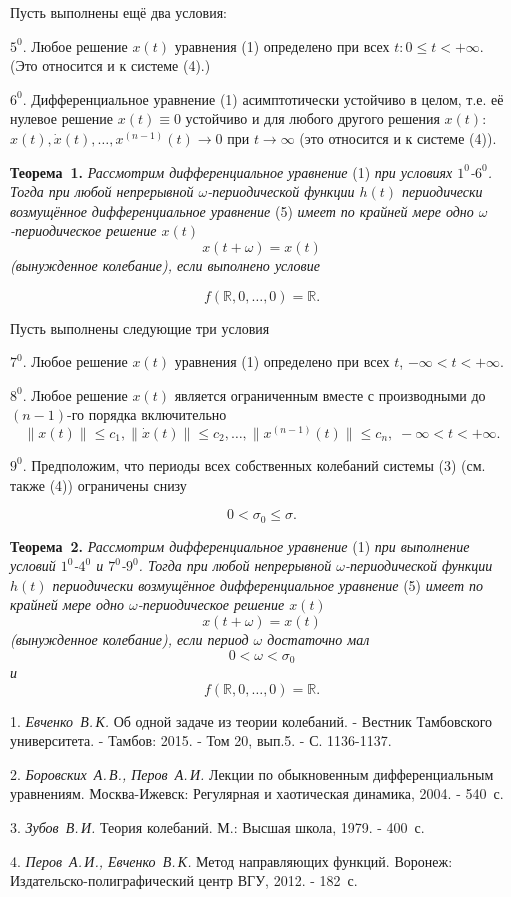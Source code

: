 Пусть выполнены ещё  два условия:

$5^0$. Любое решение $x(t)$ уравнения (1)  определено при всех $t:0\leqslant t< +\infty$.
(Это относится и к системе (4).)

$6^0$. Дифференциальное уравнение (1) асимптотически устойчиво в целом, т.е. её нулевое решение
$x(t)\equiv 0$ устойчиво и для любого другого решения $x(t)$:
$x(t), \dot x(t),\ldots , x^{(n-1)}(t)\rightarrow 0$ при  $t\rightarrow\infty$ (это относится и к системе (4)).

\textbf{Теорема~1.} {\it Рассмотрим дифференциальное уравнение} (1) {\it при условиях $1^0$-$6^0$. Тогда
	при любой непрерывной $\omega$-пе\-ри\-о\-ди\-чес\-кой функции  $h(t)$ периодически возмущённое дифференциальное
	уравнение} (5) {\it имеет по крайней мере одно $\omega$-периодическое решение  $x(t)$
		$$x(t+\omega)=x(t)$$
	(вынужденное колебание), если выполнено условие}

$$f(\mathbb{ R},0,\ldots,0)=\mathbb{ R}.$$



Пусть выполнены следующие три условия

$7^0$. Любое решение $x(t)$ уравнения (1) определено при всех $t$, $-\infty<t<+\infty$.

$8^0$. Любое решение $x(t)$ является ограниченным вместе с производными до $(n-1)$-го порядка включительно
$$\|x(t)\|\leqslant c_1, \|\dot{x}(t)\|\leqslant c_2, \ldots, \|x^{(n-1)}(t)\|\leqslant c_n,\;  -\infty<t<+\infty.$$

$9^0$. Предположим, что периоды всех собственных колебаний системы (3) (см. также (4)) ограничены снизу

$$ 0<\sigma_0 \leqslant \sigma. $$

\textbf{Теорема~2.} {\it Рассмотрим дифференциальное уравнение} (1) {\it при выполнение условий $1^0$-$4^0$ и $7^0$-$9^0$. Тогда
	при любой непрерывной  $\omega$-периодической функции  $h(t)$  периодически возмущённое дифференциальное
	уравнение} (5) {\it имеет по крайней мере одно $\omega$-периодическое решение  $x(t)$
		$$x(t+\omega)=x(t) $$
	(вынужденное колебание), если период $\omega$ достаточно мал
		$$0<\omega< \sigma_0 $$
	и}
$$f(\mathbb{ R},0,\ldots,0)=\mathbb{ R}.$$

\litlist

1.  {\it Евченко~В.\,К.} Об одной задаче из теории колебаний.
- Вестник Тамбовского университета. - Тамбов: 2015. - Том 20, вып.5. - С. 1136-1137.

2. {\it Боровских~А.\,В., Перов~А.\,И.} Лекции по обыкновенным дифференциальным
уравнениям. Москва-Ижевск: Регулярная и хаотическая динамика, 2004. - 540~с.

3. {\it Зубов~В.\,И.} Теория колебаний. М.: Высшая школа, 1979. - 400~с.

4. {\it Перов~А.\,И., Евченко~В.\,К.} Метод направляющих функций.
Воронеж: Издательско-полиграфический центр ВГУ, 2012. - 182~с.










